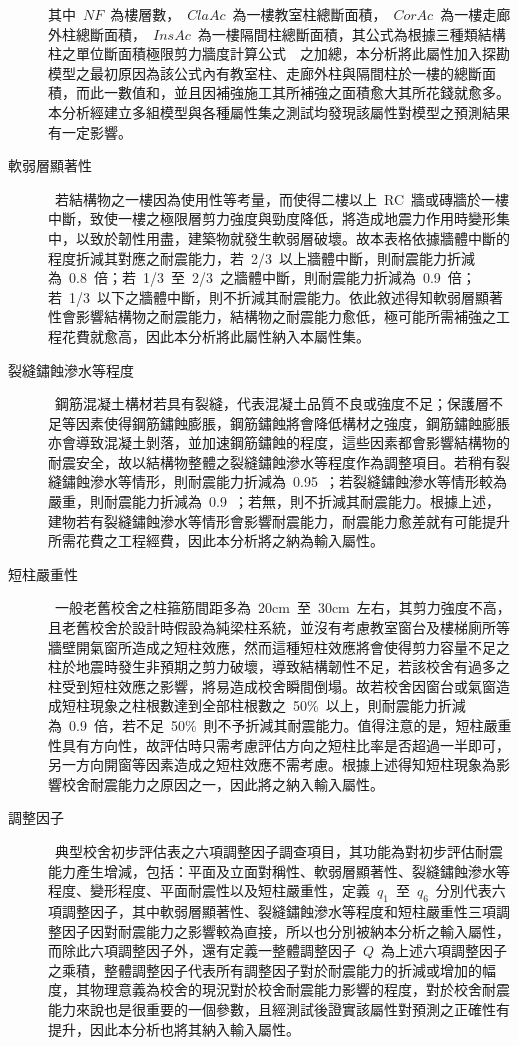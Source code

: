 \begin{description}
  其中~$NF$~為樓層數，~$ClaAc$~為一樓教室柱總斷面積，~$CorAc$~為一樓走廊外柱總斷面積，~$InsAc$~為一樓隔間柱總斷面積，其公式為根據三種類結構柱之單位斷面積極限剪力牆度計算公式~\cite{su2008master}~之加總，本分析將此屬性加入探勘模型之最初原因為該公式內有教室柱、走廊外柱與隔間柱於一樓的總斷面積，而此一數值和，並且因補強施工其所補強之面積愈大其所花錢就愈多。本分析經建立多組模型與各種屬性集之測試均發現該屬性對模型之預測結果有一定影響。
  \item[軟弱層顯著性]
  \cite{ncree03049}~若結構物之一樓因為使用性等考量，而使得二樓以上~RC~牆或磚牆於一樓中斷，致使一樓之極限層剪力強度與勁度降低，將造成地震力作用時變形集中，以致於韌性用盡，建築物就發生軟弱層破壞。故本表格依據牆體中斷的程度折減其對應之耐震能力，若~2/3~以上牆體中斷，則耐震能力折減為~0.8~倍；若~1/3~至~2/3~之牆體中斷，則耐震能力折減為~0.9~倍；若~1/3~以下之牆體中斷，則不折減其耐震能力。依此敘述得知軟弱層顯著性會影響結構物之耐震能力，結構物之耐震能力愈低，極可能所需補強之工程花費就愈高，因此本分析將此屬性納入本屬性集。
  \item[裂縫鏽蝕滲水等程度]
  \cite{ncree03049}~鋼筋混凝土構材若具有裂縫，代表混凝土品質不良或強度不足；保護層不足等因素使得鋼筋鏽蝕膨脹，鋼筋鏽蝕將會降低構材之強度，鋼筋鏽蝕膨脹亦會導致混凝土剝落，並加速鋼筋鏽蝕的程度，這些因素都會影響結構物的耐震安全，故以結構物整體之裂縫鏽蝕滲水等程度作為調整項目。若稍有裂縫鏽蝕滲水等情形，則耐震能力折減為~0.95~；若裂縫鏽蝕滲水等情形較為嚴重，則耐震能力折減為~0.9~；若無，則不折減其耐震能力。根據上述，建物若有裂縫鏽蝕滲水等情形會影響耐震能力，耐震能力愈差就有可能提升所需花費之工程經費，因此本分析將之納為輸入屬性。
  \item[短柱嚴重性]
  \cite{ncree03049}~一般老舊校舍之柱箍筋間距多為~20cm~至~30cm~左右，其剪力強度不高，且老舊校舍於設計時假設為純梁柱系統，並沒有考慮教室窗台及樓梯廁所等牆壁開氣窗所造成之短柱效應，然而這種短柱效應將會使得剪力容量不足之柱於地震時發生非預期之剪力破壞，導致結構韌性不足，若該校舍有過多之柱受到短柱效應之影響，將易造成校舍瞬間倒塌。故若校舍因窗台或氣窗造成短柱現象之柱根數達到全部柱根數之~50\%~以上，則耐震能力折減為~0.9~倍，若不足~50\%~則不予折減其耐震能力。值得注意的是，短柱嚴重性具有方向性，故評估時只需考慮評估方向之短柱比率是否超過一半即可，另一方向開窗等因素造成之短柱效應不需考慮。根據上述得知短柱現象為影響校舍耐震能力之原因之一，因此將之納入輸入屬性。
  \item[調整因子]
  \cite{ncree03049}~典型校舍初步評估表之六項調整因子調查項目，其功能為對初步評估耐震能力產生增減，包括：平面及立面對稱性、軟弱層顯著性、裂縫鏽蝕滲水等程度、變形程度、平面耐震性以及短柱嚴重性，定義~$q_1$~至~$q_6$~分別代表六項調整因子，其中軟弱層顯著性、裂縫鏽蝕滲水等程度和短柱嚴重性三項調整因子因對耐震能力之影響較為直接，所以也分別被納本分析之輸入屬性，而除此六項調整因子外，還有定義一整體調整因子~$Q$~為上述六項調整因子之乘積，整體調整因子代表所有調整因子對於耐震能力的折減或增加的幅度，其物理意義為校舍的現況對於校舍耐震能力影響的程度，對於校舍耐震能力來說也是很重要的一個參數，且經測試後證實該屬性對預測之正確性有提升，因此本分析也將其納入輸入屬性。

\end{description}
